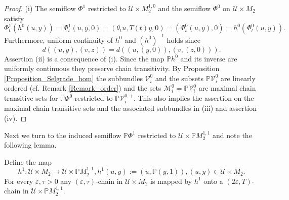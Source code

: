 \documentclass{siamltex}%
\begin{document}
\begin{proof}
(i) The semiflow $\Phi^{1}$ restricted to $\mathcal{U}\times M_{2}^{1,0}$ and
the semiflow $\Phi^{0}$ on $\mathcal{U}\times M_{2}$ satisfy%
\[
\Phi_{t}^{1}(h^{0}(u,y))=\Phi_{t}^{1}(u,y,0)=(\theta_{t}u,T(t)y,0)=(\Phi
_{t}^{0}(u,y),0)=h^{0}(\Phi_{t}^{0}(u,y)).
\]
Furthermore, uniform continuity of $h^{0}$ and $(h^{0})^{-1}$ holds since%
\[
d((u,y),(v,z))=d((u,(y,0)),(v,(z,0))).
\]
Assertion (ii) is a consequence of (i). Since the map $\mathbb{P}h^{0}$ and
its inverse are uniformly continuous they preserve chain transitivity. By
Proposition \ref{Proposition_Selgrade_hom} the subbundles $\mathcal{V}_{i}%
^{0}$ and the subsets $\mathbb{P}\mathcal{V}_{i}^{0}$ are linearly ordered
(cf. Remark \ref{Remark_order}) and the sets $\mathcal{M}_{i}^{0}%
=\mathbb{P}\mathcal{V}_{i}^{0}$ are maximal chain transitive sets for
$\mathbb{P}\Phi^{0}$ restricted to $\mathbb{P}\mathcal{V}_{i}^{0,+}$. This
also implies the assertion on the maximal chain transitive sets and the
associated subbundles in (iii) and assertion (iv).
\end{proof}

Next we turn to the induced semiflow $\mathbb{P}\Phi^{1}$ restricted to
$\mathcal{U}\times\mathbb{P}M_{2}^{1,1}$ and note the following lemma.

\begin{lemma}
\label{Lemma_epsilon}Define the map%
\begin{equation}
h^{1}:\mathcal{U}\times M_{2}\rightarrow\mathcal{U}\times\mathbb{P}M_{2}%
^{1,1},h^{1}(u,y):=(u,\mathbb{P}\left(  y,1\right)  ),(u,y)\in\mathcal{U}%
\times M_{2}. \label{h1}%
\end{equation}
For every $\varepsilon,\tau>0$ any $(\varepsilon,\tau)$-chain in
$\mathcal{U}\times M_{2}$ is mapped by $h^{1}$ onto a $(2\varepsilon,T)$-chain
in $\mathcal{U}\times\mathbb{P}M_{2}^{1,1}$.
\end{lemma}
\end{document}
